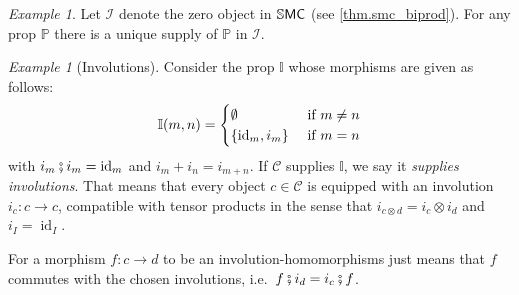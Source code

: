 \documentclass[11pt, oneside, article]{memoir}
\theoremstyle{plain}
\theoremstyle{definition}
\theoremstyle{remark}
\newtheorem{example}[theorem]{Example}
\newcommand{\cat}[1]{\mathcal{#1}}%
\newcommand{\ccat}[1]{\mathbb{#1}}%
\newcommand{\Cat}[1]{{\mathsf{#1}}}%
\newcommand{\CCat}[1]{\mathbb{\StrLeft{#1}{1}}\Cat{\StrGobbleLeft{#1}{1}}}%
\DeclareMathOperator{\id}{id}
\newcommand{\tn}[1]{\textnormal{#1}}
\newcommand{\ssmc}{\CCat{SMC}}
\newcommand{\pp}{\mathbb{P}}
\newcommand{\zero}{\cat{I}}
\newcommand{\cp}{\mathbin{\fatsemi}}
\begin{document}
\begin{example}\label{ex.terminal_supply}
Let $\zero$ denote the zero object in $\ssmc$ (see \cref{thm.smc_biprod}). For any prop $\pp$ there is a unique supply of $\pp$ in $\zero$.
\end{example}

\begin{example}[Involutions]\label{ex.supply_involutions}
Consider the prop $\ccat{I}$ whose morphisms are given as follows:
\[
  \ccat{I}(m,n)=
  \begin{cases}
  	\emptyset&\tn{ if }m\neq n\\
		\{\id_m, i_m\}&\tn{ if }m=n
  \end{cases}
 \]
 with $i_m\cp i_m=\id_m$ and $i_m+i_n=i_{m+n}$. If $\cat{C}$ supplies $\ccat{I}$, we say it \emph{supplies involutions}. That means that every object $c\in\cat{C}$ is equipped with an involution $i_c\colon c\to c$, compatible with tensor products in the sense that $i_{c\otimes d}=i_c\otimes i_d$ and $i_I=\id_I$.
 
For a morphism $f\colon c\to d$ to be an involution-homomorphisms just means that $f$ commutes with the chosen involutions, i.e.\ $f\cp i_d=i_c\cp f$.
\end{example}
\end{document}
